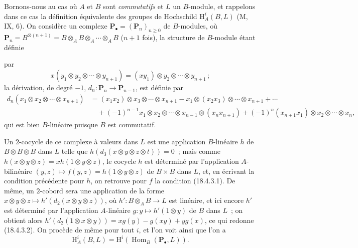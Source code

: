 \begin{env}[18.4.4]
\label{0.18.4.4-fr}
Bornons-nous au cas où $A$ et $B$ sont \emph{commutatifs} et $L$ un
$B$-module, et rappelons dans ce cas la définition équivalente des groupes de
Hochschild $\mathrm H_A^i(B,L)$ (M, IX, 6). On considère un complexe
$\mathbf P_\bullet=(\mathbf P_n)_{n\geqslant0}$ de $B$-modules, où
$\mathbf P_n=B^{\otimes(n+1)}=B\otimes_A B\otimes_A\cdots\otimes_A B$
($n+1$ fois), la structure de $B$-module étant définie


par
\[
  x(y_1\otimes y_2\otimes\cdots\otimes y_{n+1})
  =(xy_1)\otimes y_2\otimes\cdots\otimes y_{n+1}\,;
\]
la dérivation, de degré $-1$, $d_n:\mathbf P_n\to\mathbf P_{n-1}$, est
définie par
\begin{align*}
  d_n(x_1\otimes x_2\otimes\cdots\otimes x_{n+1})
    &=(x_1x_2)\otimes x_3\otimes\cdots\otimes x_{n+1}
      -x_1\otimes(x_2x_3)\otimes\cdots\otimes x_{n+1}+\cdots\\
    &\quad+(-1)^{n-1}x_1\otimes x_2\otimes\cdots\otimes x_{n-1}
      \otimes(x_nx_{n+1})
      +(-1)^n(x_{n+1}x_1)\otimes x_2\otimes\cdots\otimes x_n,
\end{align*}
qui est bien $B$-linéaire puisque $B$ est commutatif.

Un $2$-cocycle de ce complexe à valeurs dans $L$ est une application
$B$-linéaire $h$ de $B\otimes B\otimes B$ dans $L$ telle que
$h(d_3(x\otimes y\otimes z\otimes t))=0$~; mais comme
$h(x\otimes y\otimes z)=xh(1\otimes y\otimes z)$, le cocycle $h$ est déterminé
par l'application $A$-bilinéaire
$(y,z)\longmapsto f(y,z)=h(1\otimes y\otimes z)$ de $B\times B$ dans $L$, et,
en écrivant la condition précédente pour $h$, on retrouve pour $f$ la
condition (18.4.3.1). De même, un $2$-cobord sera une application de la forme
$x\otimes y\otimes z\longmapsto h'(d_2(x\otimes y\otimes z))$, où
$h':B\otimes_A B\to L$ est linéaire, et ici encore $h'$ est déterminé par
l'application $A$-linéaire $g:y\longmapsto h'(1\otimes y)$ de $B$ dans $L$~;
on obtient alors
$h'(d_2(1\otimes x\otimes y))=xg(y)-g(xy)+yg(x)$, ce qui redonne (18.4.3.2).
On procède de même pour tout $i$, et l'on voit ainsi que l'on a
\begin{equation}
\label{0.18.4.4.1-fr}
\tag{18.4.4.1}
  \mathrm H_A^i(B,L)=\mathrm H^i(\operatorname{Hom}_B(\mathbf P_\bullet,L)).
\end{equation}
\end{env}

